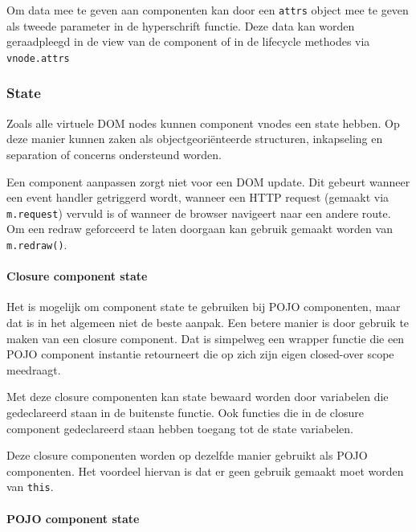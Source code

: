 Om data mee te geven aan componenten kan door een \texttt{attrs} object mee te geven als tweede parameter in de hyperschrift functie. %
Deze data kan worden geraadpleegd in de view van de component of in de lifecycle methodes via \texttt{vnode.attrs} \autocite{Mithril2019a}

\subsubsection{State}

Zoals alle virtuele DOM nodes kunnen component vnodes een state hebben. Op deze manier kunnen zaken als objectgeoriënteerde structuren, inkapseling en separation of concerns  ondersteund worden. \autocite{Mithril2019a}

Een component aanpassen zorgt niet voor een DOM update. Dit gebeurt wanneer een event handler getriggerd wordt, wanneer een HTTP request (gemaakt via \texttt{m.request}) vervuld is of wanneer de browser navigeert naar een andere route. Om een redraw geforceerd te laten doorgaan kan gebruik gemaakt worden van \texttt{m.redraw()}. \autocite{Mithril2019a}

\paragraph{Closure component state}

Het is mogelijk om component state te gebruiken bij POJO componenten, maar dat is in het algemeen niet de beste aanpak. Een betere manier is door gebruik te maken van een closure component. Dat is simpelweg een wrapper functie die een POJO component instantie retourneert die op zich zijn eigen closed-over scope meedraagt. \autocite{Mithril2019a}

Met deze closure componenten kan state bewaard worden door variabelen die gedeclareerd staan in de buitenste functie. Ook functies die in de closure component gedeclareerd staan hebben toegang tot de state variabelen. \autocite{Mithril2019a}

Deze closure componenten worden op dezelfde manier gebruikt als POJO componenten. Het voordeel hiervan is dat er geen gebruik gemaakt moet worden van \texttt{this}. \autocite{Mithril2019a}

\paragraph{POJO component state}

